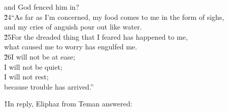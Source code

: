 \begin{poetry}
\poemll    and God fenced him in? \\
\poeml \v{24}``As far as I'm concerned, my food comes to me in the form of sighs, \\
\poemll    and my cries of anguish pour out like water. \\
\poeml \v{25}For the dreaded thing that I feared has happened to me, \\
\poemll    what caused me to worry has engulfed me. \\
\poeml \v{26}I will not be at ease; \\
\poemll    I will not be quiet; \\
\poeml I will not rest; \\
\poemll    because trouble has arrived.''
\end{poetry}

\v{1}In reply, Eliphaz from Teman answered:

